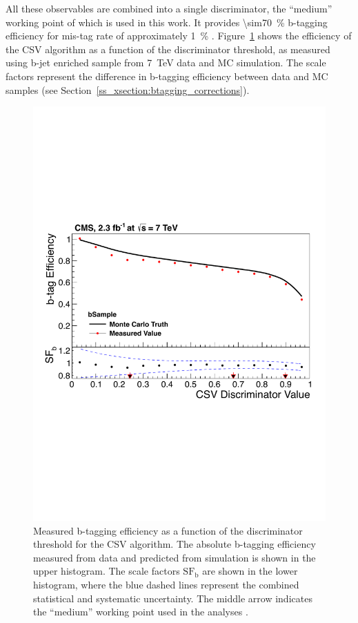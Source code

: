 All these observables are combined into a single discriminator, the ``medium'' working point of which is used in this
work. It provides \SI{\sim70}{\percent} b-tagging efficiency for mis-tag rate of approximately \SI{1}{\percent}
\autocite{b-tagging_CMS}. Figure~\ref{fig:CSV_efficiency} shows the efficiency of the CSV algorithm as a function of
the discriminator threshold, as measured using b-jet enriched sample from \SI{7}{\TeV} data and MC simulation. The scale
factors represent the difference in b-tagging efficiency between data and MC samples (see
Section~\ref{ss_xsection:btagging_corrections}).

\begin{figure}[htbp]
  \centering
  \leavevmode
  \includegraphics[width=0.7\columnwidth]{CSV_efficiency}
  \caption[b-tagging efficiency for the CSV algorithm]{Measured b-tagging efficiency as a function of the discriminator
  threshold for the CSV algorithm. The absolute b-tagging efficiency measured from data and predicted from simulation is
  shown in the upper histogram. The scale factors $\textrm{SF}_\textrm{b}$ are shown in the lower histogram, where the
  blue dashed lines represent the combined statistical and systematic uncertainty. The middle arrow indicates the
  ``medium'' working point used in the analyses \autocite{b-tagging_CMS}.}
  \label{fig:CSV_efficiency}
\end{figure}

